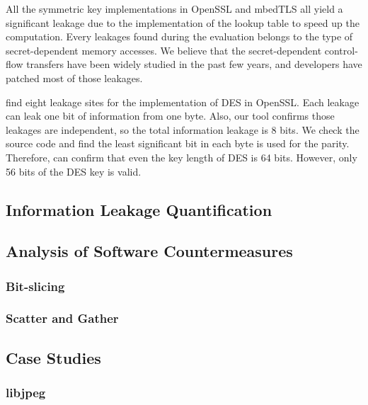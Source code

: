All the symmetric key implementations in OpenSSL and mbedTLS all yield
a significant leakage due to the implementation of the lookup table
to speed up the computation. Every leakages found during the evaluation
belongs to the type of secret-dependent memory accesses. We believe that
the secret-dependent control-flow transfers have been widely studied in
the past few years, and developers have patched most of those leakages. 

\tool{} find eight leakage sites for the implementation of DES in OpenSSL.
Each leakage can leak one bit of information from one byte. Also, our tool
confirms those leakages are independent, so the total information leakage
is 8 bits. We check the source code and find the least significant
bit in each byte is used for the parity. Therefore, \tool{} can confirm
that even the key length of DES is 64 bits. However, only 56 bits of the 
DES key is valid.


\subsection{Information Leakage Quantification}
\subsection{Analysis of Software Countermeasures}
\subsubsection{Bit-slicing}
\subsubsection{Scatter and Gather}
\subsection{Case Studies}
\subsubsection{libjpeg}

